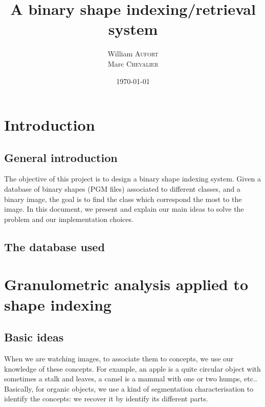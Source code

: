 

\title{A binary shape indexing/retrieval system}
\author{
    William \textsc{Aufort}\\
    Marc \textsc{Chevalier}
}
\date{\today}


\maketitle

\section*{Introduction}

\subsection*{General introduction}

The objective of this project is to design a binary shape indexing system. Given a database of binary shapes (PGM files) associated to different classes, and a binary image, the goal is to find the class which correspond the most to the image. In this document, we present and explain our main ideas to solve the problem and our implementation choices.

\subsection*{The database used}


\section{Granulometric analysis applied to shape indexing}

\subsection{Basic ideas}

When we are watching images, to associate them to concepts, we use our knowledge of these concepts. For example, an apple is a quite circular object with sometimes a stalk and leaves, a camel is a mammal with one or two humps, etc.. Basically, for organic objects, we use a kind of segmentation characterisation to identify the concepts: we recover it by identify its different parts.

